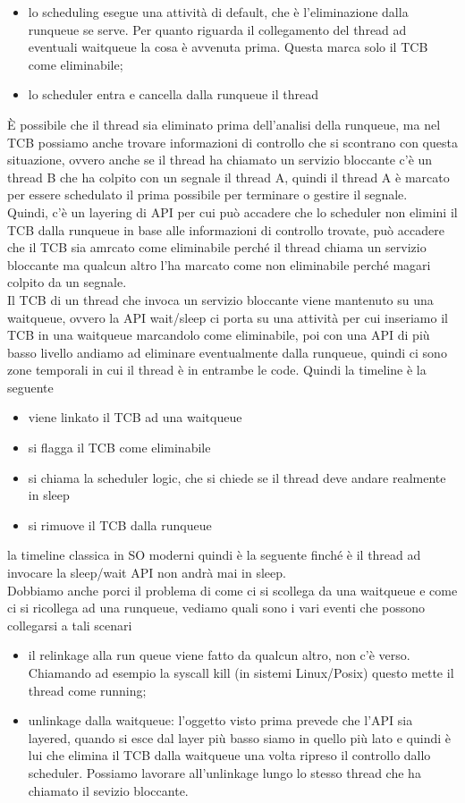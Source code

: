 \documentclass[12pt, oneside]{extbook}
\begin{document}
\begin{itemize}
\item lo scheduling esegue una attività di default, che è l'eliminazione dalla runqueue se serve. Per quanto riguarda il collegamento del thread ad eventuali waitqueue la cosa è avvenuta prima. Questa marca solo il TCB come eliminabile;
\item lo scheduler entra e cancella dalla runqueue il thread
\end{itemize}
È possibile che il thread sia eliminato prima dell'analisi della runqueue, ma nel TCB possiamo anche trovare informazioni di controllo che si scontrano con questa situazione, ovvero anche se il thread ha chiamato un servizio bloccante c'è un thread B che ha colpito con un segnale il thread A, quindi il thread A è marcato per essere schedulato il prima possibile per terminare o gestire il segnale.\\Quindi, c'è un layering di API per cui può accadere che lo scheduler non elimini il TCB dalla runqueue in base alle informazioni di controllo trovate, può accadere che il TCB sia amrcato come eliminabile perché il thread chiama un servizio bloccante ma qualcun altro l'ha marcato come non eliminabile perché magari colpito da un segnale.\\Il TCB di un thread che invoca un servizio bloccante viene mantenuto su una waitqueue, ovvero la API wait/sleep ci porta su una attività per cui inseriamo il TCB in una waitqueue marcandolo come eliminabile, poi con una API di più basso livello andiamo ad eliminare eventualmente dalla runqueue, quindi ci sono zone temporali in cui il thread è in entrambe le code. Quindi la timeline è la seguente
\begin{itemize}
\item viene linkato il TCB ad una waitqueue
\item si flagga il TCB come eliminabile
\item si chiama la scheduler logic, che si chiede se il thread deve andare realmente in sleep
\item si rimuove il TCB dalla runqueue
\end{itemize}
la timeline classica in SO moderni quindi è la seguente
finché è il thread ad invocare la sleep/wait API non andrà mai in sleep.\\Dobbiamo anche porci il problema di come ci si scollega da una waitqueue e come ci si ricollega ad una runqueue, vediamo quali sono i vari eventi che possono collegarsi a tali scenari
\begin{itemize}
\item il relinkage alla run queue viene fatto da qualcun altro, non c'è verso. Chiamando ad esempio la syscall kill (in sistemi Linux/Posix) questo mette il thread come running;
\item unlinkage dalla waitqueue: l'oggetto visto prima prevede che l'API sia layered, quando si esce dal layer più basso siamo in quello più lato e quindi è lui che elimina il TCB dalla waitqueue una volta ripreso il controllo dallo scheduler. Possiamo lavorare all'unlinkage lungo lo stesso thread che ha chiamato il sevizio bloccante.
\end{itemize}
\end{document}
